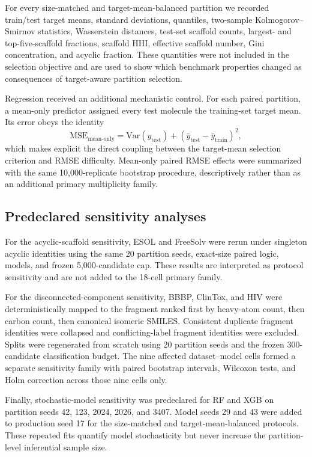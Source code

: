 For every size-matched and target-mean-balanced partition we recorded train/test target means, standard deviations, quantiles, two-sample Kolmogorov--Smirnov statistics, Wasserstein distances, test-set scaffold counts, largest- and top-five-scaffold fractions, scaffold HHI, effective scaffold number, Gini concentration, and acyclic fraction. These quantities were not included in the selection objective and are used to show which benchmark properties changed as consequences of target-aware partition selection.

Regression received an additional mechanistic control. For each paired partition, a mean-only predictor assigned every test molecule the training-set target mean. Its error obeys the identity
\begin{equation}
 \mathrm{MSE}_{\mathrm{mean\text{-}only}}=\mathrm{Var}(y_{\mathrm{test}})+(\bar y_{\mathrm{test}}-\bar y_{\mathrm{train}})^2,
 \label{eq:mean-only-decomp}
\end{equation}
which makes explicit the direct coupling between the target-mean selection criterion and RMSE difficulty. Mean-only paired RMSE effects were summarized with the same 10,000-replicate bootstrap procedure, descriptively rather than as an additional primary multiplicity family.

\subsection{Predeclared sensitivity analyses}

For the acyclic-scaffold sensitivity, ESOL and FreeSolv were rerun under singleton acyclic identities using the same 20 partition seeds, exact-size paired logic, models, and frozen 5,000-candidate cap. These results are interpreted as protocol sensitivity and are not added to the 18-cell primary family.

For the disconnected-component sensitivity, BBBP, ClinTox, and HIV were deterministically mapped to the fragment ranked first by heavy-atom count, then carbon count, then canonical isomeric SMILES. Consistent duplicate fragment identities were collapsed and conflicting-label fragment identities were excluded. Splits were regenerated from scratch using 20 partition seeds and the frozen 300-candidate classification budget. The nine affected dataset--model cells formed a separate sensitivity family with paired bootstrap intervals, Wilcoxon tests, and Holm correction across those nine cells only.

Finally, stochastic-model sensitivity was predeclared for RF and XGB on partition seeds 42, 123, 2024, 2026, and 3407. Model seeds 29 and 43 were added to production seed 17 for the size-matched and target-mean-balanced protocols. These repeated fits quantify model stochasticity but never increase the partition-level inferential sample size.
